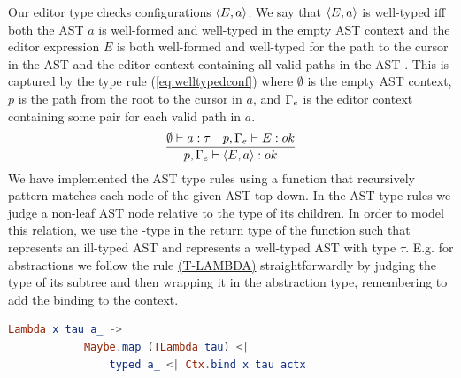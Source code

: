 Our editor type checks configurations $\langle E,a \rangle$. We say that
$\langle E,a \rangle$ is well-typed iff both the AST $a$ is
well-formed and well-typed in the empty AST context and the editor
expression $E$
is both well-formed and well-typed for the path to the cursor in the AST and
the editor context containing all valid paths in the AST \pepm. This
is captured by the type rule
(\ref{eq:welltypedconf}) where $\emptyset$ is the empty AST context, $p$ is the
path from the root to the cursor in $a$, and $\Gamma_{e}$ is the editor context
containing some pair for each valid path in $a$.
%
\begin{equation}\label{eq:welltypedconf}
  \frac{\emptyset \vdash a : \tau \quad p,\Gamma_{e} \vdash E : ok} {p,\Gamma_{e} \vdash \langle E,a \rangle : ok}\\ 
\end{equation}
%
We have implemented the AST type rules using a function that recursively
pattern matches each node of the given AST top-down. In the AST type rules we
judge a non-leaf AST node relative to the type of its children. In order to
model this relation, we use the -type in the return type of the
function such that  represents an ill-typed AST and  represents a well-typed AST with type $\tau$. E.g. for abstractions we
follow the rule \hyperref[fig:asttyperules]{(T-LAMBDA)} straightforwardly by
judging the type of its subtree and then wrapping it in the abstraction type,
remembering to add the binding to the context.

\begin{lstlisting}[language=elm,%
                    gobble=8,%
                    mathescape,%
                    ]
        Lambda x tau a_ ->
            Maybe.map (TLambda tau) <|
                typed a_ <| Ctx.bind x tau actx
\end{lstlisting}

